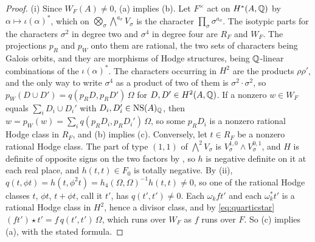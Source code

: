 \begin{proof}
(i) Since $W_{F}(A)\ne0$, (a) implies (b). Let $F^{\times}$ act on $H^{*}(A,\mathbb{Q})$ by
$\alpha\mapsto\iota(\alpha)^{*}$, which on
$\bigotimes_{\sigma}\bigwedge^{a_{\sigma}}V_{\sigma}$ is the character
$\prod_{\sigma}\sigma^{a_{\sigma}}$. The isotypic parts for the characters
$\sigma^{2}$ in degree two and $\sigma^{4}$ in degree four are $R_{F}$ and
$W_{F}$. The projections $p_{R}$ and $p_{W}$ onto them are rational, the two
sets of characters being Galois orbits, and they are morphisms of Hodge
structures, being $\mathbb{Q}$-linear combinations of the $\iota(\alpha)^{*}$. The
characters occurring in $H^{2}$ are the products $\rho\rho'$, and the only way
to write $\sigma^{4}$ as a product of two of them is $\sigma^{2}\cdot\sigma^{2}$,
so $p_{W}(D\cup D')=q(p_{R}D,p_{R}D')\,\Omega$ for $D,D'\in H^{2}(A,\mathbb{Q})$. If a
nonzero $w\in W_{F}$ equals $\sum_{i}D_{i}\cup D_{i}'$ with
$D_{i},D_{i}'\in\mathrm{NS}(A)_{\mathbb{Q}}$, then
$w=p_{W}(w)=\sum_{i}q(p_{R}D_{i},p_{R}D_{i}')\,\Omega$, so some $p_{R}D_{i}$ is
a nonzero rational Hodge class in $R_{F}$, and (b) implies (c). Conversely,
let $t\in R_{F}$ be a nonzero rational Hodge class. The part of type $(1,1)$
of $\bigwedge^{2}V_{\sigma}$ is $V_{\sigma}^{1,0}\wedge V_{\sigma}^{0,1}$, and
$H$ is definite of opposite signs on the two factors by \cite[Proposition~17.3(i)]{paperI},
so $h$ is negative definite on it at each real place, and $h(t,t)\in F_{0}$ is
totally negative. By (ii),
$q(t,\phi t)=h(t,\phi^{2}t)=h_{4}(\Omega,\Omega)^{-1}h(t,t)\ne0$, so one of the
rational Hodge classes $t$, $\phi t$, $t+\phi t$, call it $t'$, has
$q(t',t')\ne0$. Each $\omega_{k}ft'$ and each $\omega_{k}^{*}t'$ is a rational
Hodge class in $H^{2}$, hence a divisor class, and by \eqref{eq:quarticstar}
$(ft')\star t'=f\,q(t',t')\,\Omega$, which runs over $W_{F}$ as $f$ runs over
$F$. So (c) implies (a), with the stated formula.


\end{proof}
